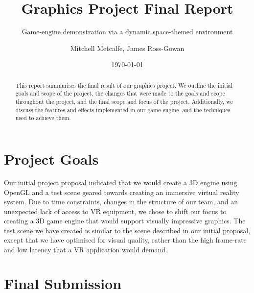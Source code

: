 \documentclass[11pt]{scrartcl} %
\title{Graphics Project Final Report}
\subtitle{Game-engine demonstration via a dynamic space-themed environment}
\author{ Mitchell Metcalfe, James Ross-Gowan }
\date{\today} %
\begin{document}
\maketitle

\begin{abstract}

    This report summarises the final result of our graphics project. We outline
    the initial goals and scope of the project, the changes that were made to
    the goals and scope throughout the project, and the final scope and focus
    of the project. Additionally, we discuss the features and effects
    implemented in our game-engine, and the  techniques used to achieve them.

\end{abstract}


\section{Project Goals}

    Our initial project proposal indicated that we would create a 3D engine
    using OpenGL and a test scene geared towards creating an immersive virtual
    reality system. Due to time constraints, changes in the structure of our
    team, and an unexpected lack of access to VR equipment, we chose to shift
    our focus to creating a 3D game engine that would support visually
    impressive graphics. The test scene we have created is similar to the scene
    described in our initial proposal, except that we have optimised for visual
    quality, rather than the high frame-rate and low latency that a VR
    application would demand.


\section{Final Submission}
\end{document}
